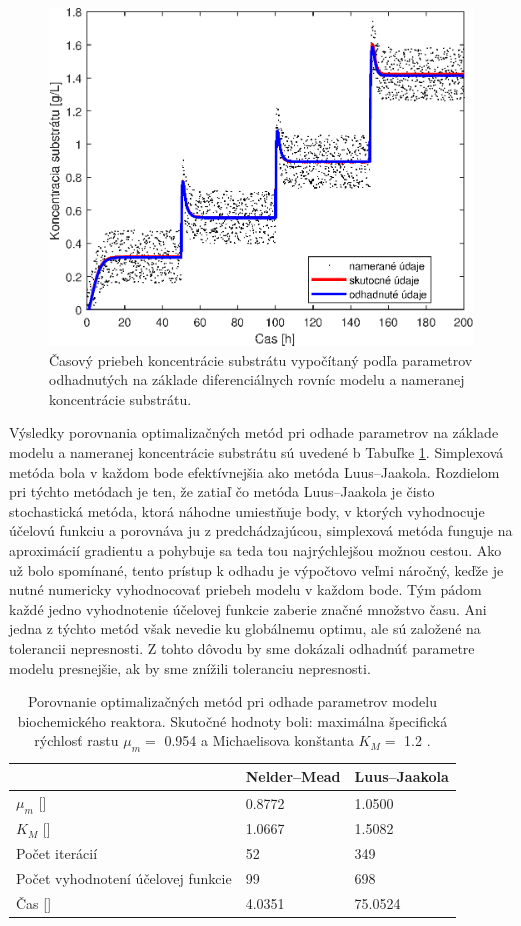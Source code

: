 \begin{figure}
	\centering
	\includegraphics[width=.7\linewidth]{images/param_approx_diff_eq}
	\caption[]{Časový priebeh koncentrácie substrátu vypočítaný podľa parametrov odhadnutých na základe diferenciálnych rovníc modelu a nameranej koncentrácie substrátu.}
	\label{fig:9}
\end{figure}

Výsledky porovnania optimalizačných metód pri odhade parametrov na základe modelu a nameranej koncentrácie substrátu sú uvedené b Tabuľke \ref{tab: 4}. Simplexová metóda bola v každom bode efektívnejšia ako metóda Luus--Jaakola. Rozdielom pri týchto metódach je ten, že zatiaľ čo metóda Luus--Jaakola je čisto stochastická metóda, ktorá náhodne umiestňuje body, v ktorých vyhodnocuje účelovú funkciu a porovnáva ju z predchádzajúcou, simplexová metóda funguje na aproximácií gradientu a pohybuje sa teda tou najrýchlejšou možnou cestou. Ako už bolo spomínané, tento prístup k odhadu je výpočtovo veľmi náročný, keďže je nutné numericky vyhodnocovať priebeh modelu v každom bode. Tým pádom každé jedno vyhodnotenie účelovej funkcie zaberie značné množstvo času. Ani jedna z týchto metód však nevedie ku globálnemu optimu, ale sú založené na tolerancii nepresnosti. Z tohto dôvodu by sme dokázali odhadnúť parametre modelu presnejšie, ak by sme znížili toleranciu nepresnosti.

\begin{table}
	\centering
	\caption{Porovnanie optimalizačných metód pri odhade parametrov modelu biochemického reaktora. Skutočné hodnoty boli: maximálna špecifická rýchlosť rastu $\mu_{m} = $ 0.954  a Michaelisova konštanta $K_{M} = $ 1.2 \unitfrac{\gram}{\liter}.}
	\label{tab: 4}
	\begin{tabular}{lll}
		\hline
		& \textbf{Nelder--Mead} & \textbf{Luus--Jaakola} \\
		\hline
		$\mu_{m}$ [\unitfrac{1}{\hour}] & 0.8772 & 1.0500 \\
		$K_{M}$ [\unitfrac{\gram}{\liter}] & 1.0667 & 1.5082 \\
		Počet iterácií & 52 & 349 \\
		Počet vyhodnotení účelovej funkcie & 99 & 698 \\
		Čas [\second] & 4.0351 & 75.0524 \\
		\hline
	\end{tabular}
\end{table}

